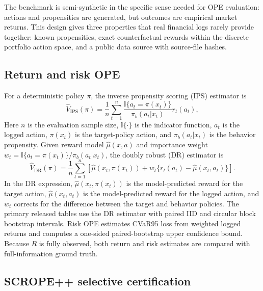 \documentclass[conference]{IEEEtran}
\begin{document}
The benchmark is semi-synthetic in the specific sense needed for OPE evaluation: actions and propensities are generated, but outcomes are empirical market returns. This design gives three properties that real financial logs rarely provide together: known propensities, exact counterfactual rewards within the discrete portfolio action space, and a public data source with source-file hashes.

\subsection{Return and risk OPE}

For a deterministic policy $\pi$, the inverse propensity scoring (IPS) estimator is
\begin{equation}
    \widehat V_{\mathrm{IPS}}(\pi)
    = \frac{1}{n}\sum_{t=1}^{n}
    \frac{\mathbb{I}\{a_t=\pi(x_t)\}}{\pi_b(a_t|x_t)} r_t(a_t),
\end{equation}
Here $n$ is the evaluation sample size, $\mathbb{I}\{\cdot\}$ is the indicator function, $a_t$ is the logged action, $\pi(x_t)$ is the target-policy action, and $\pi_b(a_t|x_t)$ is the behavior propensity. Given reward model $\hat{\mu}(x,a)$ and importance weight $w_t=\mathbb{I}\{a_t=\pi(x_t)\}/\pi_b(a_t|x_t)$, the doubly robust (DR) estimator is
\begin{equation}
    \widehat V_{\mathrm{DR}}(\pi)
    = \frac{1}{n}\sum_{t=1}^{n}
    \left[\hat{\mu}(x_t,\pi(x_t))+
    w_t\{r_t(a_t)-\hat{\mu}(x_t,a_t)\}\right].
\end{equation}
In the DR expression, $\hat{\mu}(x_t,\pi(x_t))$ is the model-predicted reward for the target action, $\hat{\mu}(x_t,a_t)$ is the model-predicted reward for the logged action, and $w_t$ corrects for the difference between the target and behavior policies. The primary released tables use the DR estimator with paired IID and circular block bootstrap intervals. Risk OPE estimates CVaR95 loss from weighted logged returns and computes a one-sided paired-bootstrap upper confidence bound. Because $R$ is fully observed, both return and risk estimates are compared with full-information ground truth.

\subsection{SCROPE++ selective certification}
\end{document}
